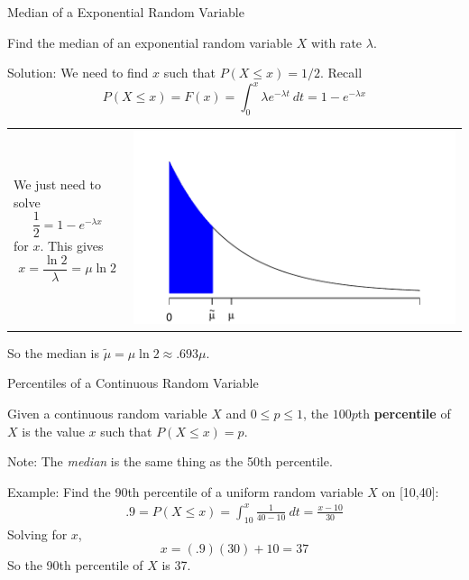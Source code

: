 \documentclass[handout]{beamer}
\renewcommand{\emph}{\textbf}
\begin{document}
\begin{frame}{Median of a Exponential Random Variable}
\begin{block}{}
Find the median of an exponential random variable $X$ with rate $\lambda$.
\end{block}
\pause Solution: We need to find $x$ such that $P(X \leq x)=1/2$. \pause Recall
$$P(X \leq x) = F(x) = \int_0^x \lambda e^{-\lambda t}\ dt = 1-e^{-\lambda x}$$

\vspace{-.2cm}
\begin{tabular}{p{4.5cm}p{6cm}}
\vspace{0cm}
\pause We just need to solve
$$\frac12 = 1-e^{-\lambda x}$$
for $x$. \pause This gives $$x=\frac{\ln 2}{\lambda} = \mu\ln 2$$
\pause 
&\vspace{-.4cm}\includegraphics[scale=.55]{ch4_cdf_exp2.pdf}
\end{tabular}

\vspace{-.2cm}
So the median is $\tilde\mu = \mu\ln 2 \approx .693 \mu$.
\end{frame}

\begin{frame}{Percentiles of a Continuous Random Variable}
\begin{block}{}
Given a continuous random variable $X$ and $0\leq p\leq 1$, the $100p$th \emph{percentile} of $X$ is the value $x$ such that $P(X \leq x)=p$.
\end{block}
Note: The \textit{median} is the same thing as the 50th percentile.

\vspace{.2cm}
\pause Example: Find the 90th percentile of a uniform random variable $X$ on [10,40]:
\pause \begin{align*}
.9 = P(X\leq x) = \int_{10}^x \frac1{40-10}\ dt = \frac{x-10}{30}
\end{align*}
\pause Solving for $x$,
$$x=(.9)(30)+10 = 37$$
\pause So the 90th percentile of $X$ is 37.
\end{frame}
\end{document}
